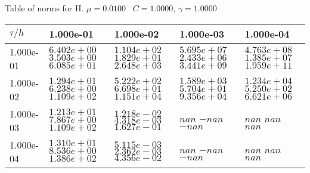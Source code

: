 \begin{center}
Table of norms for H. $\mu = 0.0100$ \, $C = 1.0000$, $\gamma = 1.0000$
  
\begin{tabular}{|p{1in}|p{1in}|p{1in}|p{1in}|p{1in}|} \hline
$\tau / h$ &1.000e-01 &1.000e-02 &1.000e-03 &1.000e-04 \\ \hline 
1.000e-01 & $6.402e+00$  $3.503e+00$  $6.085e+01$  & $1.104e+02$  $1.829e+01$  $2.648e+03$  & $5.695e+07$  $2.433e+06$  $3.441e+09$  & $4.763e+08$  $1.385e+07$  $1.959e+11$  \\ \hline 
1.000e-02 & $1.294e+01$  $6.238e+00$  $1.109e+02$  & $5.222e+02$  $6.698e+01$  $1.151e+04$  & $1.589e+03$  $5.704e+01$  $9.356e+04$  & $1.234e+04$  $5.250e+02$  $6.621e+06$  \\ \hline 
1.000e-03 & $1.213e+01$  $7.867e+00$  $1.109e+02$  & $1.218e-02$  $4.318e-03$  $1.627e-01$  & $nan$  $-nan$  $-nan$  & $nan$  $nan$  $nan$  \\ \hline 
1.000e-04 & $1.310e+01$  $8.536e+00$  $1.386e+02$  & $5.115e-03$  $2.362e-03$  $4.356e-02$  & $nan$  $-nan$  $-nan$  & $nan$  $nan$  $nan$  \\ \hline 

\end{tabular}\\[20pt]
\end{center}

